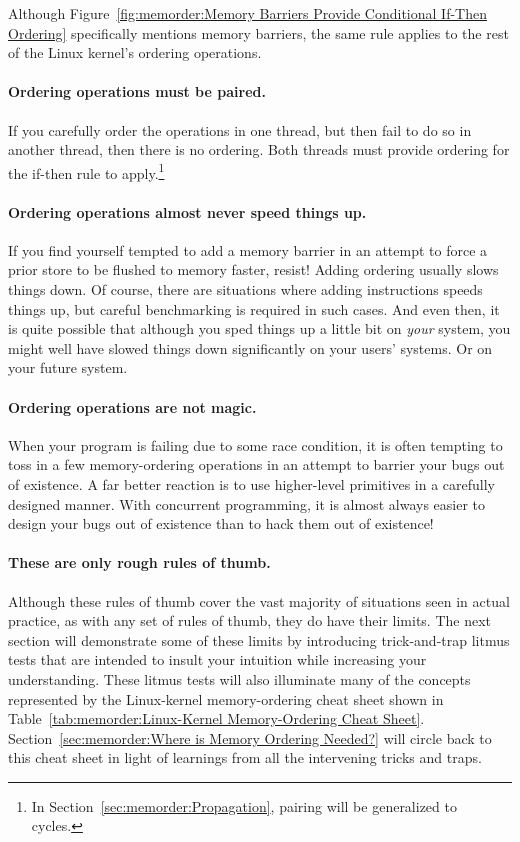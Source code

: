 Although
Figure~\ref{fig:memorder:Memory Barriers Provide Conditional If-Then Ordering}
specifically mentions memory barriers, the same rule applies to the
rest of the Linux kernel's ordering operations.

\paragraph{Ordering operations must be paired.}
If you carefully order the operations in one thread, but then fail to do
so in another thread, then there is no ordering.
Both threads must provide ordering for the if-then rule to apply.\footnote{
	In Section~\ref{sec:memorder:Propagation}, pairing will be
	generalized to cycles.}

\paragraph{Ordering operations almost never speed things up.}
If you find yourself tempted to add a memory barrier in an attempt
to force a prior store to be flushed to memory faster, resist!
Adding ordering usually slows things down.
Of course, there are situations where adding instructions speeds things
up, but careful benchmarking is required in such cases.
And even then, it is quite possible that although you sped things up
a little bit on \emph{your} system, you might well have slowed things
down significantly on your users' systems.
Or on your future system.

\paragraph{Ordering operations are not magic.}
When your program is failing due to some race condition, it is often
tempting to toss in a few memory-ordering operations in an attempt
to barrier your bugs out of existence.
A far better reaction is to use higher-level primitives in a carefully
designed manner.
With concurrent programming, it is almost always easier to design
your bugs out of existence than to hack them out of existence!

\paragraph{These are only rough rules of thumb.}
Although these rules of thumb cover the vast majority of situations
seen in actual practice, as with any set of rules of thumb, they
do have their limits.
The next section will demonstrate some of these limits by introducing
trick-and-trap litmus tests that are intended to insult your
intuition while increasing your understanding.
These litmus tests will also illuminate many of the concepts
represented by the Linux-kernel memory-ordering cheat sheet shown in
Table~\ref{tab:memorder:Linux-Kernel Memory-Ordering Cheat Sheet}.
Section~\ref{sec:memorder:Where is Memory Ordering Needed?} will
circle back to this cheat sheet in light of learnings from all the
intervening tricks and traps.

